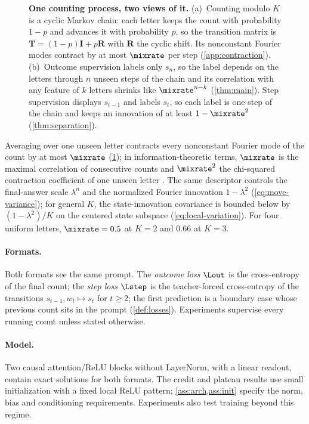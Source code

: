\begin{figure}[t]
\centering
\resizebox{\linewidth}{!}{}
\caption{\textbf{One counting process, two views of it.}
(a)~Counting modulo $K$ is a cyclic Markov chain: each letter keeps the count with probability $1-p$ and advances it with probability
$p$, so the transition matrix is $\mathbf T=(1-p)\mathbf I+p\mathbf R$ with $\mathbf R$ the cyclic shift. Its nonconstant Fourier modes
contract by at most $\mixrate$ per step (\cref{app:contraction}).
(b)~Outcome supervision labels only $s_n$, so the label depends on the letters through $n$ unseen steps of the chain and its
correlation with any feature of $k$ letters shrinks like $\mixrate^{n-k}$ (\cref{thm:main}). Step supervision displays $s_{t-1}$ and labels $s_t$, so each label is one
step of the chain and keeps an innovation of at least $1-\mixrate^2$ (\cref{thm:separation}).}
\label{fig:chain}
\end{figure}

Averaging over one unseen letter contracts every nonconstant Fourier mode of the count by at most $\mixrate$ (\cref{fig:chain}); in information-theoretic terms,
$\mixrate$ is the maximal correlation of consecutive counts and $\mixrate^2$ the chi-squared contraction coefficient of one
unseen letter \citep{witsenhausen1975sequences,raginsky2016strong}.
The same descriptor controls the final-answer scale $\lambda^n$ and the
normalized Fourier innovation $1-\lambda^2$ (\cref{eq:move-variance}); for general
$K$, the state-innovation covariance is bounded below by
$(1-\lambda^2)/K$ on the centered state subspace (\cref{eq:local-variation}).
For four uniform letters,
$\mixrate=0.5$ at $K=2$ and $0.66$ at $K=3$.

\paragraph{Formats.} Both formats see the same prompt. The \emph{outcome loss} $\Lout$ is the cross-entropy of the final
count; the \emph{step loss} $\Lstep$ is the teacher-forced cross-entropy of the transitions $s_{t-1},w_t\mapsto s_t$ for
$t\ge2$; the first prediction is a boundary case whose previous count sits in the prompt (\cref{def:losses}). Experiments
supervise every running count unless stated otherwise.

\paragraph{Model.} Two causal attention/ReLU blocks without LayerNorm, with a linear readout,
contain exact solutions for both formats. The credit and plateau results use small initialization
with a fixed local ReLU pattern; \cref{ass:arch,ass:init} specify the norm, bias and conditioning
requirements. Experiments also test training beyond this regime.

